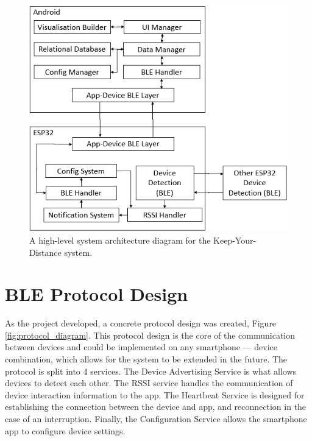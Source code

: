 \documentclass{l4proj}
\begin{document}
\begin{figure}[!htb]
    \centering
    \includegraphics[width=0.5\linewidth]{images/high-level_system_architecture.png}

    \caption{ A high-level system architecture diagram for the Keep-Your-Distance system. }

    \label{fig:arch_diagram}
\end{figure}

\section{BLE Protocol Design}

As the project developed, a concrete protocol design was created, Figure \ref{fig:protocol_diagram}. This protocol design is the core of the communication between devices and could be implemented on any smartphone — device combination, which allows for the system to be extended in the future. The protocol is split into 4 services. The Device Advertising Service is what allows devices to detect each other. The RSSI service handles the communication of device interaction information to the app. The Heartbeat Service is designed for establishing the connection between the device and app, and reconnection in the case of an interruption. Finally, the Configuration Service allows the smartphone app to configure device settings.
\end{document}
